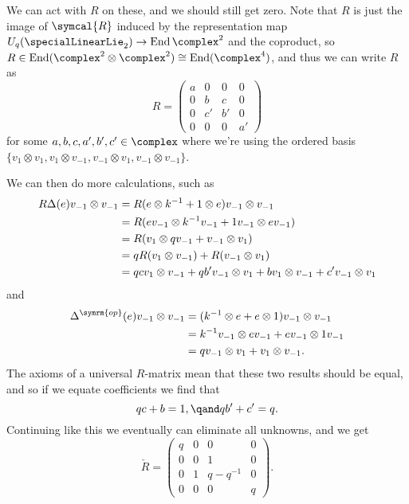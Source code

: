\documentclass[fleqn]{NotesClass}
\DeclareMathOperator{\End}{End}
\newcommand{\op}{\symrm{op}}
\newcommand{\isomorphic}{\cong}
\newcommand{\universalRmatrix}{\symcal{R}}
\begin{document}
    We can act with \(R\) on these, and we should still get zero.
    Note that \(R\) is just the image of \(\universalRmatrix\) induced by the representation map \(U_q(\specialLinearLie_2) \to \End \complex^2\) and the coproduct, so \(R \in \End(\complex^2 \otimes \complex^2) \isomorphic \End(\complex^4)\), and thus we can write \(R\) as
    \begin{equation}
        R =
        \begin{pmatrix}
            a & 0 & 0 & 0\\
            0 & b & c & 0\\
            0 & c' & b' & 0\\
            0 & 0 & 0 & a'
        \end{pmatrix}
    \end{equation}
    for some \(a, b, c, a', b', c' \in \complex\) where we're using the ordered basis \(\{v_1 \otimes v_1, v_1 \otimes v_{-1}, v_{-1} \otimes v_1, v_{-1}\otimes v_{-1}\}\).
    
    We can then do more calculations, such as
    \begin{align}
        R\Delta(e) v_{-1} \otimes v_{-1} &= R(e \otimes k^{-1} + 1 \otimes e)v_{-1} \otimes v_{-1}\\
        &= R(ev_{-1} \otimes k^{-1}v_{-1} + 1v_{-1} \otimes ev_{-1})\\
        &= R(v_1 \otimes qv_{-1} + v_{-1} \otimes v_1)\\
        &= qR(v_1 \otimes v_{-1}) + R(v_{-1} \otimes v_1)\\
        &= qcv_1 \otimes v_{-1} + qb' v_{-1} \otimes v_1 + bv_1 \otimes v_{-1} + c'v_{-1} \otimes v_1\notag
    \end{align}
    and
    \begin{align}
        \Delta^{\op}(e)v_{-1} \otimes v_{-1} &= (k^{-1} \otimes e + e \otimes 1)v_{-1} \otimes v_{-1}\\
        &= k^{-1}v_{-1} \otimes ev_{-1} + e v_{-1} \otimes 1v_{-1}\\
        &= qv_{-1} \otimes v_1 + v_1 \otimes v_{-1}.
    \end{align}
    The axioms of a universal \(R\)-matrix mean that these two results should be equal, and so if we equate coefficients we find that
    \begin{equation}
        qc + b = 1, \qand qb' + c' = q.
    \end{equation}
    Continuing like this we eventually can eliminate all unknowns, and we get
    \begin{equation}
        \check{R} = 
        \begin{pmatrix}
            q & 0 & 0 & 0\\
            0 & 0 & 1 & 0\\
            0 & 1 & q - q^{-1} & 0\\
            0 & 0 & 0 & q
        \end{pmatrix}
        .
    \end{equation}
    
\end{document}
